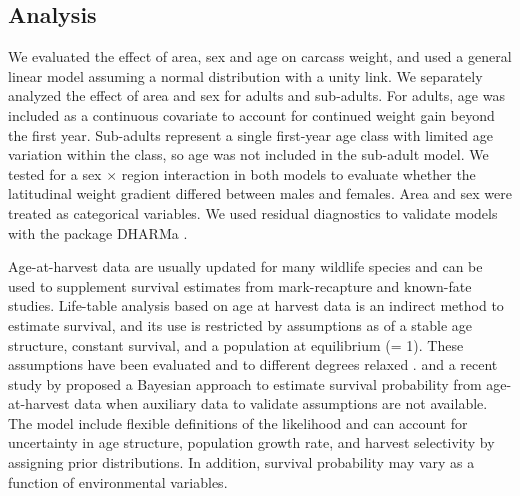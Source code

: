 \documentclass[PCJ,Unicode,screen]{cedram}
\begin{document}


\subsection*{Analysis}

We evaluated the effect of area, sex and age on carcass weight, and used a general linear model assuming a normal distribution with a unity link. We separately analyzed the effect of area and sex for adults and sub-adults. For adults, age was included as a continuous covariate to account for continued weight gain beyond the first year. Sub-adults represent a single first-year age class with limited age variation within the class, so age was not included in the sub-adult model. We tested for a sex $\times$ region interaction in both models to evaluate whether the latitudinal weight gradient differed between males and females. Area and sex were treated as categorical variables. We used residual diagnostics to validate models with the package DHARMa \citep{hartigDHARMaResidualDiagnostics2022}.

Age-at-harvest data are usually updated for many wildlife species and can be used to supplement survival estimates from mark-recapture and known-fate studies. Life-table analysis based on age at harvest data is an indirect method to estimate survival, and its use is restricted by assumptions as of a stable age structure, constant survival, and a population at equilibrium (\lambda = 1). These assumptions have been evaluated and to different degrees relaxed \citep{udevitzEstimatingSurvivalRates1998}. and a recent study by \citet{skellyFlexibleBayesianApproach} proposed a Bayesian approach to estimate survival probability from age-at-harvest data when auxiliary data to validate assumptions are not available. The model include flexible definitions of the likelihood and can account for uncertainty in age structure, population growth rate, and harvest selectivity by assigning prior distributions. In addition,  survival probability may vary as a function of environmental variables. 
\end{document}
